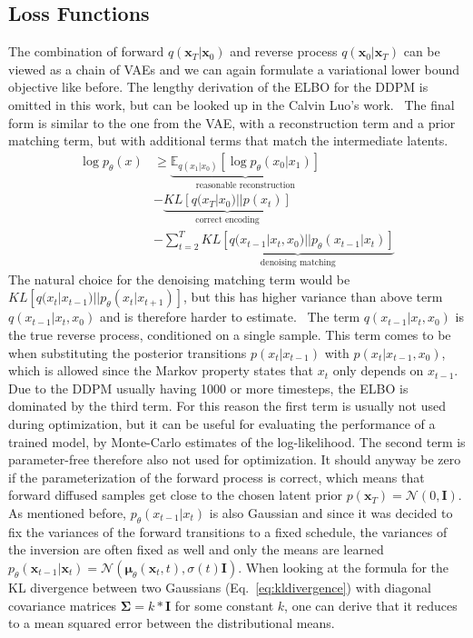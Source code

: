 \subsection{Loss Functions}
The combination of forward $q(\bm{x}_T|\bm{x}_0)$ and reverse process $q(\bm{x}_0|\bm{x}_T)$ can be viewed as a chain of VAEs and we can again formulate a variational lower bound objective like before. The lengthy derivation of the ELBO for the DDPM is omitted in this work, but can be looked up in the Calvin Luo's work.~\autocite{luo2022understanding} The final form is similar to the one from the VAE, with a reconstruction term and a prior matching term, but with additional terms that match the intermediate latents.
\begin{align}
    \log p_{\theta}(x) & \geq \underbrace{\mathbb{E}_{q(x_1|x_0)} \left[ \log p_{\theta}(x_0|x_1) \right]}_{\text{reasonable reconstruction}}          \\
                       & - \underbrace{KL \left[ q(x_T|x_0) || p(x_t) \right]}_{\text{correct encoding}}                                               \\
                       & - \sum_{t=2}^{T} \underbrace{KL \left[ q(x_{t-1}|x_{t},x_0) || p_{\theta}(x_{t-1}|x_{t}) \right]}_{\text{denoising matching}}
\end{align}
The natural choice for the denoising matching term would be $KL\left[ q(x_t|x_{t-1}) || p_{\theta}(x_t|x_{t+1}) \right]$, but this has higher variance than above term $q(x_{t-1}|x_{t},x_0)$ and is therefore harder to estimate.~\autocite{ho2020denoising} The term $q(x_{t-1}|x_{t},x_0)$ is the true reverse process, conditioned on a single sample. This term comes to be when substituting the posterior transitions $p(x_t|x_{t-1})$ with $p(x_t|x_{t-1}, x_0)$, which is allowed since the Markov property states that $x_t$ only depends on $x_{t-1}$.  Due to the DDPM usually having 1000 or more timesteps, the ELBO is dominated by the third term. For this reason the first term is usually not used during optimization, but it can be useful for evaluating the performance of a trained model, by Monte-Carlo estimates of the log-likelihood. The second term is parameter-free therefore also not used for optimization. It should anyway be zero if the parameterization of the forward process is correct, which means that forward diffused samples get close to the chosen latent prior $p(\bm{x}_T) = \mathcal{N}(0,\bm{I})$. As mentioned before, $p_{\theta}(x_{t-1}|x_t)$ is also Gaussian and since it was decided to fix the variances of the forward transitions to a fixed schedule, the variances of the inversion are often fixed as well and only the means are learned $p_{\theta}(\bm{x}_{t-1} | \bm{x}_t) = \mathcal{N}(\bm{\mu}_{\theta}(\bm{x}_t, t),\sigma (t) \bm{I})$. When looking at the formula for the KL divergence between two Gaussians (Eq.~\ref{eq:kldivergence}) with diagonal covariance matrices $\bm{\Sigma} = k*\bm{I}$ for some constant $k$, one can derive that it reduces to a mean squared error between the distributional means.~\autocite{luo2022understanding}
